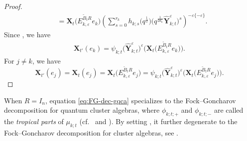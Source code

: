 \documentclass[pdftex]{sigma}
\numberwithin{equation}{section}
\begin{document}
\begin{proof}
\begin{align*}
 &=\mathbf{X}_{t}\bigl(E^{\tilde{B}_{t}R}_{k,\varepsilon}e_{k}\bigr)\left(\sum\limits^{r_{k}}_{s=0}h_{k;s}\bigl(q^{\frac{1}{2}}\bigr)\bigl(q^{\frac{1}{2d_{k}}}\mathbf{\hat{Y}}_{k;t}^{\varepsilon}\bigr)^{s}\right)^{-\varepsilon\{-\varepsilon\}}.
 \end{align*}
 Since , we have
 \begin{align*}
 \mathbf{X}_{t'}(e_{k})=\psi_{k;t}\bigl(\mathbf{\hat{Y}}_{k;t}^{\varepsilon}\bigr)^{\varepsilon}\bigl(\mathbf{X}_{t}\bigl(E^{\tilde{B}_{t}R}_{k,\varepsilon}e_{k}\bigr)\bigr).
 \end{align*}
 For $j\neq k$, we have
 \[
 \mathbf{X}_{t'}(e_{j})
 =\mathbf{X}_{t}(e_{j})
 =\mathbf{X}_{t}\bigl(E^{\tilde{B}_{t}R}_{k,\varepsilon}e_{j}\bigr)
 =\psi_{k;t}\bigl(\mathbf{\hat{Y}}_{k;t}^{\varepsilon}\bigr)^{\varepsilon}\bigl(\mathbf{X}_{t}\bigl(E^{\tilde{B}_{t}R}_{k,\varepsilon}e_{j}\bigr)\bigr).\tag*{\qed}
 \]\renewcommand{\qed}{}
\end{proof}

\begin{Remark}
When $R=I_n$, equation \eqref{eq:FG-dec-gqca} specializes to the Fock--Goncharov decomposition for quantum cluster algebras, where $\phi_{k;t;+}$ and $\phi_{k;t;-}$ are called the {\it tropical parts} of $\mu_{k;t}$ (cf.\ \cite[Section 3.3]{fock2009} and \cite[Section 6.3]{Keller2012}). By setting , it further degenerate to the Fock--Goncharov decomposition for cluster algebras, see \cite[Section 2.3]{LMN2023}.
\end{Remark}
\end{document}
